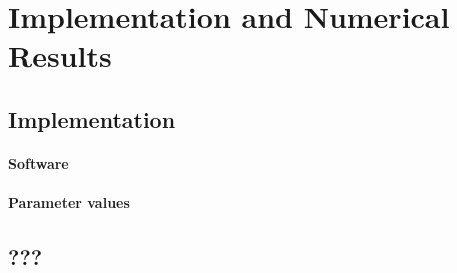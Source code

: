 \section{Implementation and Numerical Results}
\label{sec:84results}


\dummytext[1]{}

\subsection{Implementation}

\paragraph{Software}


\dummytext[1]{}

\paragraph{Parameter values}

\cite{Cai10Stable}

\dummytext[1]{}

\subsection{???}

\dummytext[23]{}
